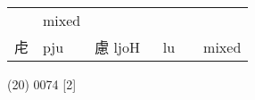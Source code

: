 \documentclass[14pt,a4paper]{scrartcl}
\begin{document}
\begin{longtable}[c]{@{}llllll@{}}
\begin{minipage}[t]{0.14\columnwidth}
\strut\end{minipage} &
\begin{minipage}[t]{0.14\columnwidth}\raggedright\strut
mixed
\strut\end{minipage}\tabularnewline
\begin{minipage}[t]{0.14\columnwidth}\raggedright\strut
虍
\strut\end{minipage} &
\begin{minipage}[t]{0.14\columnwidth}\raggedright\strut
pju
\strut\end{minipage} &
\begin{minipage}[t]{0.14\columnwidth}\raggedright\strut
慮 ljoH
\strut\end{minipage} &
\begin{minipage}[t]{0.14\columnwidth}\raggedright\strut
𧆨 lu
\strut\end{minipage} &
\begin{minipage}[t]{0.14\columnwidth}\raggedright\strut
\strut\end{minipage} &
\begin{minipage}[t]{0.14\columnwidth}\raggedright\strut
mixed
\strut\end{minipage}\tabularnewline
\bottomrule
\end{longtable}

(20) 0074 {[}2{]}
\end{document}
